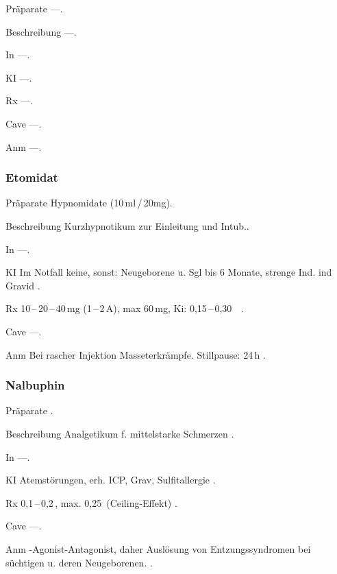 \begin{labeling}[:]{mm}
  \item[Präparate] ---.
  \item[Beschreibung] ---.
  \item[In] ---.
  \item[KI] ---.
  \item[Rx] ---.
  \item[Cave] ---.
  \item[Anm] ---.
\end{labeling}
\subsubsection{Etomidat}

\begin{labeling}[:]{mm}
  \item[Präparate]  Hypnomidate (10\,ml\,/\,20mg).
  \item[Beschreibung] Kurzhypnotikum zur Einleitung und Intub..
  \item[In] ---.
  \item[KI]  Im Notfall keine, sonst: Neugeborene u. Sgl bis 6 Monate, strenge
Ind. ind Gravid .
  \item[Rx]  10\,--\,20\,--\,40\,mg (1\,--\,2\,A), max 60\,mg, Ki:
  0,15\,--\,0,30~\, .
  \item[Cave] ---.
  \item[Anm]  Bei rascher Injektion Masseterkrämpfe. Stillpause: 24\,h .
\end{labeling}



\subsubsection{Nalbuphin}

\begin{labeling}[:]{mm}
  \item[Präparate]  .
  \item[Beschreibung]  Analgetikum f. mittelstarke Schmerzen .
  \item[In] ---.
  \item[KI]  Atemstörungen, erh. ICP, Grav, Sulfitallergie .
  \item[Rx]  0,1\,--\,0,2\,, max. 0,25\,
  (Ceiling-Effekt) .
  \item[Cave] ---.
  \item[Anm]  {\textmu}-Agonist-Antagonist, daher Auslösung von Entzungssyndromen
bei süchtigen u. deren Neugeborenen. .
\end{labeling}


